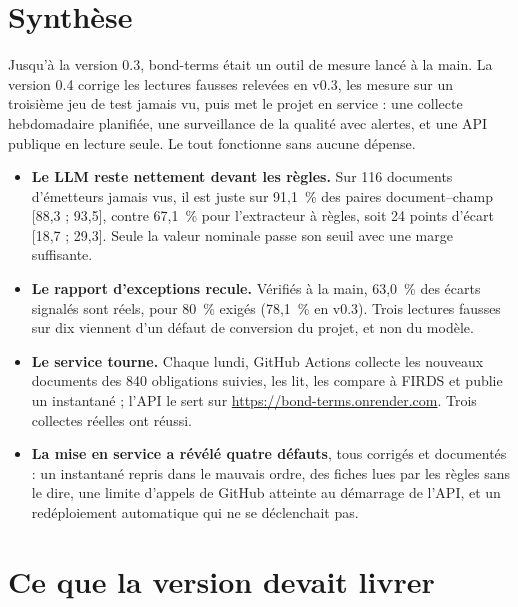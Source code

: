 \documentclass[11pt,a4paper]{article}
\begin{document}

\setcounter{tocdepth}{1}
\tableofcontents
\newpage

\section*{Synthèse}

Jusqu'à la version 0.3, bond-terms était un outil de mesure lancé à la main. La version 0.4 corrige les lectures fausses relevées en v0.3, les mesure sur un troisième jeu de test jamais vu, puis met le projet en service : une collecte hebdomadaire planifiée, une surveillance de la qualité avec alertes, et une API publique en lecture seule. Le tout fonctionne sans aucune dépense.

\begin{itemize}
  \item \textbf{Le LLM reste nettement devant les règles.} Sur 116 documents d'émetteurs jamais vus, il est juste sur 91,1~\% des paires document--champ [88,3 ; 93,5], contre 67,1~\% pour l'extracteur à règles, soit 24 points d'écart [18,7 ; 29,3]. Seule la valeur nominale passe son seuil avec une marge suffisante.
  \item \textbf{Le rapport d'exceptions recule.} Vérifiés à la main, 63,0~\% des écarts signalés sont réels, pour 80~\% exigés (78,1~\% en v0.3). Trois lectures fausses sur dix viennent d'un défaut de conversion du projet, et non du modèle.
  \item \textbf{Le service tourne.} Chaque lundi, GitHub Actions collecte les nouveaux documents des 840 obligations suivies, les lit, les compare à FIRDS et publie un instantané ; l'API le sert sur \url{https://bond-terms.onrender.com}. Trois collectes réelles ont réussi.
  \item \textbf{La mise en service a révélé quatre défauts}, tous corrigés et documentés : un instantané repris dans le mauvais ordre, des fiches lues par les règles sans le dire, une limite d'appels de GitHub atteinte au démarrage de l'API, et un redéploiement automatique qui ne se déclenchait pas.
\end{itemize}

\section{Ce que la version devait livrer}
\end{document}
